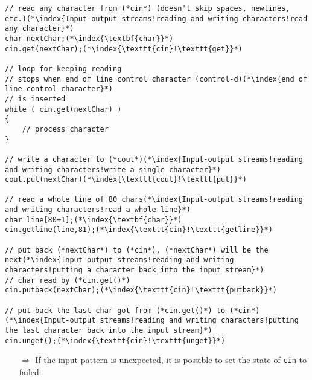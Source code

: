 \documentclass[10pt]{article}
\begin{document}
\begin{lstlisting}
// read any character from (*cin*) (doesn't skip spaces, newlines, etc.)(*\index{Input-output streams!reading and writing characters!read any character}*)
char nextChar;(*\index{\textbf{char}}*)
cin.get(nextChar);(*\index{\texttt{cin}!\texttt{get}}*)

// loop for keeping reading
// stops when end of line control character (control-d)(*\index{end of line control character}*)
// is inserted
while ( cin.get(nextChar) )
{
    // process character
}

// write a character to (*cout*)(*\index{Input-output streams!reading and writing characters!write a single character}*)
cout.put(nextChar)(*\index{\texttt{cout}!\texttt{put}}*)

// read a whole line of 80 chars(*\index{Input-output streams!reading and writing characters!read a whole line}*)
char line[80+1];(*\index{\textbf{char}}*)
cin.getline(line,81);(*\index{\texttt{cin}!\texttt{getline}}*)

// put back (*nextChar*) to (*cin*), (*nextChar*) will be the next(*\index{Input-output streams!reading and writing characters!putting a character back into the input stream}*)
// char read by (*cin.get()*)
cin.putback(nextChar);(*\index{\texttt{cin}!\texttt{putback}}*)

// put back the last char got from (*cin.get()*) to (*cin*)(*\index{Input-output streams!reading and writing characters!putting the last character back into the input stream}*)
cin.unget();(*\index{\texttt{cin}!\texttt{unget}}*)
\end{lstlisting}
\begin{enumerate}
\item[$\Rightarrow$] If the input pattern is unexpected, it is possible to set the state of \texttt{cin} to failed:
\end{enumerate}
\end{document}
